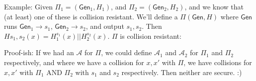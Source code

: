 \documentclass[12pt]{article}
\newcommand{\AAA}{\mathcal{A}}
\newcommand{\Gen}{\mathsf{Gen}}
\begin{document}
Example: Given $\Pi_1=(\Gen_1,H_1)$, and $\Pi_2=(\Gen_2,H_2)$, and we know that (at least) one of these is collision resistant. We'll define a $\Pi(\Gen,H)$ where $\Gen$ runs $\Gen_1\to s_1$, $\Gen_2\to s_2$, and output $s_1,s_2$. Then $H{s_1,s_2}(x)=H_1^{s_1}(x)||H_2^{s_2}(x)$. $\Pi$ is collision resistant:

Proof-ish: If we had an $\AAA$ for $\Pi$, we could define $\AAA_1$ and $\AAA_2$ for $\Pi_1$ and $\Pi_2$ respectively, and where we have a collision for $x,x'$ with $\Pi$, we have collisions for $x,x'$ with $\Pi_1$ AND $\Pi_2$ with $s_1$ and $s_2$ respectively. Then neither are secure. :)
\end{document}
